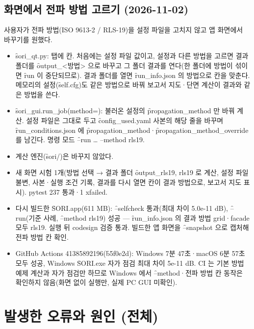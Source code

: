 \documentclass[10.5pt,a4paper]{article}
\begin{document}
\subsection{화면에서 전파 방법 고르기 (2026-11-02)}
 사용자가 전파 방법(ISO 9613-2 / RLS-19)을 설정 파일을 고치지 않고 앱 화면에서 바꾸기를 원했다.

\begin{itemize}
\item \f{sori\_qt.py}:  탭에  칸. 처음에는 설정 파일 값이고, 설정과 다른 방법을 고르면 결과 폴더를 \f{output\_<방법>} 으로 바꾸고 그 폴더 결과를 연다(한 폴더에 방법이 섞이면 \f{run} 이 중단되므로). 결과 폴더를 열면 \f{run\_info.json} 의 방법으로 칸을 맞춘다. 메모리의 설정(\f{self.cfg})도 같은 방법으로 바꿔 보고서 지도·단면 계산이 결과와 같은 방법을 쓴다.
\item \f{sori\_gui.run\_job(method=)}: 불러온 설정의 \f{propagation\_method} 만 바꿔 계산. 설정 파일은 그대로 두고 \f{config\_used.yaml} 사본의 해당 줄을 바꾸며 \f{run\_conditions.json} 에 \f{propagation\_method}·\f{propagation\_method\_override} 를 남긴다. 명령 모드 \f{--run … --method rls19}.
\item 계산 엔진(\f{sori/})은 바꾸지 않았다.
\end{itemize}

\begin{itemize}
\item 새 화면 시험 1개(방법 선택 → 결과 폴더 \f{output\_rls19}, rls19 로 계산, 설정 파일 불변, 사본·실행 조건 기록, 결과를 다시 열면 칸이 결과 방법으로, 보고서 지도 표시). pytest 237 통과·1 xfailed.
\item 다시 빌드한 \f{SORI.app}(611 MB): \f{--selfcheck} 통과(최대 차이 5.0e-11 dB), \f{--run}(기준 사례, \f{--method rls19}) 성공 — \f{run\_info.json} 의 결과 방법 grid·facade 모두 rls19. 실행 뒤 codesign 검증 통과. 빌드한 앱 화면을 \f{--snapshot} 으로 캡처해 전파 방법 칸 확인.
\item GitHub Actions 41385892196(\f{b5f0e2d}): Windows 7분 47초·macOS 6분 57초 모두 성공, Windows \f{SORI.exe} 자가 점검 최대 차이 5e-11 dB. CI 는 기본 방법 예제 계산과 자가 점검만 하므로 Windows 에서 \f{--method}·전파 방법 칸 동작은 확인하지 않음(화면 없이 실행만, 실제 PC GUI 미확인).
\end{itemize}

\section{발생한 오류와 원인 (전체)}
\end{document}
